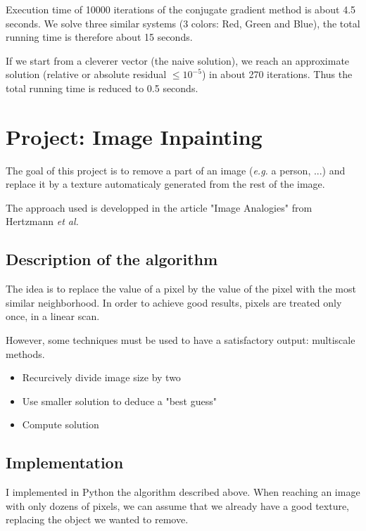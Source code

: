 \documentclass[a4paper]{article}
\begin{document}
  Execution time of 10000 iterations of the conjugate gradient method is about 4.5 seconds. We solve three similar systems (3 colors: Red, Green and Blue), the total running time is therefore about 15 seconds.
  
  \medskip If we start from a cleverer vector (the naive solution), we reach an approximate solution (relative or absolute residual $\leq 10^{-5}$) in about 270 iterations. Thus the total running time is reduced to 0.5 seconds.
  
  \newpage
  
  \section{Project: Image Inpainting}
  
  The goal of this project is to remove a part of an image (\textit{e.g.} a person, ...) and replace it by a texture automaticaly generated from the rest of the image.
  
  \medskip The approach used is developped in the article "Image Analogies" from Hertzmann \textit{et al.}
  
  \subsection{Description of the algorithm}
  
  The idea is to replace the value of a pixel by the value of the pixel with the most similar neighborhood. In order to achieve good results, pixels are treated only once, in a linear scan.
  
  \medskip However, some techniques must be used to have a satisfactory output: multiscale methods.
  \begin{itemize}
    \item Recurcively divide image size by two
    \item Use smaller solution to deduce a "best guess"
    \item Compute solution
  \end{itemize}
  
  \subsection{Implementation}
  
  I implemented in Python the algorithm described above. When reaching an image with only dozens of pixels, we can assume that we already have a good texture, replacing the object we wanted to remove.
  
\end{document}
